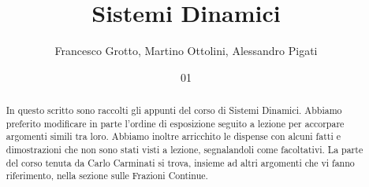 \documentclass[italian,course]{Notes}
\title{Sistemi Dinamici}
\author{Francesco Grotto, Martino Ottolini, Alessandro Pigati}
\date{01}{10}{2014}
\begin{document}
\newpage

\begin{abstract}
 In questo scritto sono raccolti gli appunti del corso di Sistemi Dinamici. 
 Abbiamo preferito modificare in parte l'ordine di esposizione seguito a lezione per accorpare argomenti simili tra loro. 
 Abbiamo inoltre arricchito le dispense con alcuni fatti e dimostrazioni che non sono stati visti a lezione, segnalandoli come facoltativi. 
 La parte del corso tenuta da Carlo Carminati si trova, insieme ad altri argomenti che vi fanno riferimento, nella sezione sulle Frazioni Continue.
\end{abstract}








\end{document}
